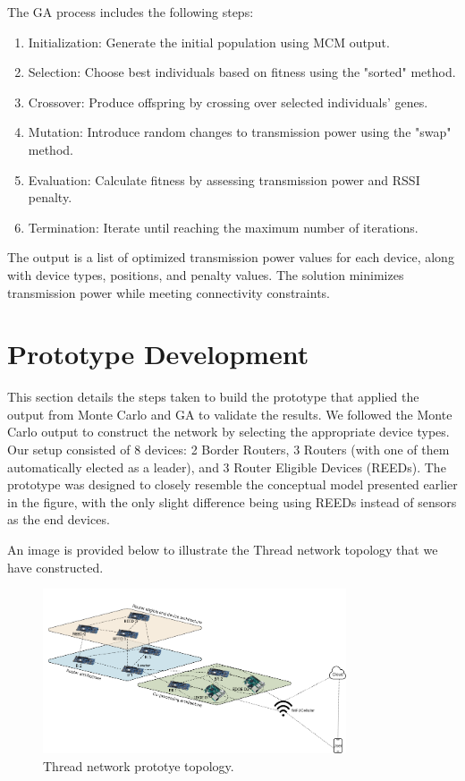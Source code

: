 The GA process includes the following steps:

\vspace{2mm}
\begin{enumerate}
    \item \textbf{}{Initialization:} Generate the initial population using MCM output.
    \item \textbf{}{Selection:} Choose best individuals based on fitness using the "sorted" method.
    \item \textbf{}{Crossover:} Produce offspring by crossing over selected individuals' genes.
    \item \textbf{}{Mutation:} Introduce random changes to transmission power using the "swap" method.
    \item \textbf{}{Evaluation:} Calculate fitness by assessing transmission power and RSSI penalty.
    \item \textbf{}{Termination:} Iterate until reaching the maximum number of iterations.
\end{enumerate}
\vspace{3mm}

The output is a list of optimized transmission power values for each device, along with device types, positions, and penalty values. The solution minimizes transmission power while meeting connectivity constraints.


\section{Prototype Development}\label{sec:prototype_development}
This section details the steps taken to build the prototype that applied the output from Monte Carlo and GA to validate the results. We followed the Monte Carlo output to construct the network by selecting the appropriate device types. Our setup consisted of 8 devices: 2 Border Routers, 3 Routers (with one of them automatically elected as a leader), and 3 Router Eligible Devices (REEDs). The prototype was designed to closely resemble the conceptual model presented earlier in the figure, with the only slight difference being using REEDs instead of sensors as the end devices.

An image is provided below to illustrate the Thread network topology that we have constructed.

\begin{figure}[h]
    \centering
    \includegraphics[width=0.8\textwidth]{images/research_design/prototype_topology.png}
    \caption{Thread network prototye topology.}
    \label{fig:prototype_topology}
\end{figure}

